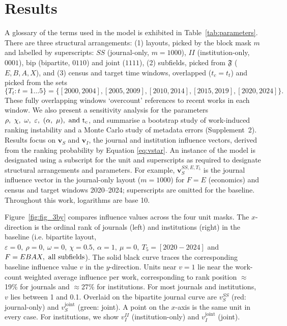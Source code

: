 \section{Results}
\label{sec:results}


A glossary of the terms used in the model is exhibited in Table~\ref{tab:parameters}. There are three structural arrangements: (1) layouts, picked by the block mask $m$ and labelled by superscripts: $SS$ (journal-only, $m=1000$), $II$ (institution-only, $0001$), $\mathrm{bip}$ (bipartite, $0110$) and $\mathrm{joint}$ ($1111$), (2) subfields, picked from $\mathfrak{F}$ ($E, B, A, X$), and (3) census and target time windows, overlapped ($t_c=t_t$) and picked from the sets \[\{T_t: t = 1 \ldots 5\} = \{[2000, 2004], [2005, 2009], [2010, 2014], [2015,2019], [2020,2024]\}.\] These fully overlapping windows `overcount' references to recent works in each window. We also present a sensitivity analysis for the parameters $\rho,~\chi,~\omega,~\varepsilon,~(\alpha,~\mu),~\rm{and}~t_c$, and summarise a bootstrap study of work-induced ranking instability and a Monte Carlo study of metadata errors (Supplement~2). Results focus on $\mathbf{v}_S$ and $\mathbf{v}_I$, the journal and institution influence vectors, derived from the ranking probability by Equation \ref{eq:vstar}. An instance of the model is designated using a subscript for the unit and superscripts as required to designate structural arrangements and parameters. For example, $\mathbf{v}_S^{SS,E,T_5}$ is the journal influence vector in the journal-only layout ($m=1000$) for $F=E$ (economics) and census and target windows 2020--2024; superscripts are omitted for the baseline. Throughout this work, logarithms are base 10.

Figure~\ref{fig:fig_3by} compares influence values across the four unit masks. The $x$-direction is the ordinal rank of journals (left) and institutions (right) in the baseline (i.e. bipartite layout, $\varepsilon=0,~\rho=0,~\omega=0,~\chi=0.5,~\alpha=1,~\mu=0,~T_5 = [2020-2024]$ and $F=EBAX,~\rm{all~subfields}$). The solid black curve traces the corresponding baseline influence value $v$ in the $y$-direction. Units near $v=1$ lie near the work-count weighted average influence per work, corresponding to rank position $\approx$19\% for journals and $\approx$27\% for institutions. For most journals and institutions, $v$ lies between  1 and 0.1. Overlaid on the bipartite journal curve are $v_S^{SS}$ (red: journal-only) and $v_S^{\mathrm{joint}}$ (green: joint). A point on the $x$-axis is the same unit in every case. For institutions, we show $v_I^{II}$ (institution-only) and $v_I^{\mathrm{joint}}$ (joint). 


